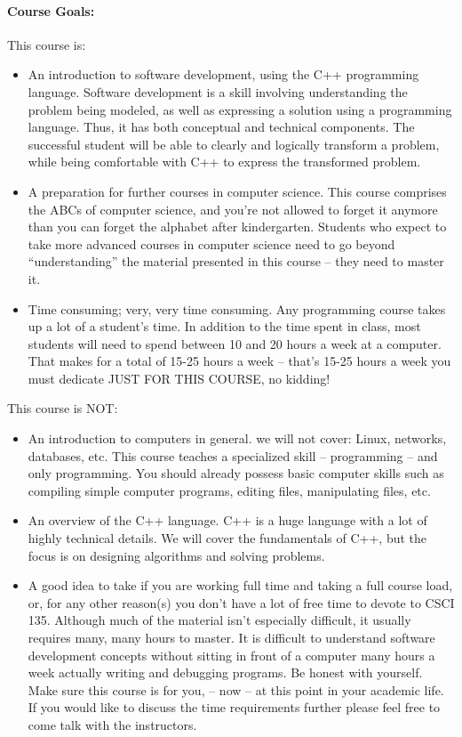 \documentclass[10pt]{article}
\begin{document}
\paragraph*{\bf Course Goals:}
This course is: 
\begin{itemize}
\item
  An introduction to software development, using the C++ programming
  language. 
  Software development is a skill involving understanding the problem
  being modeled, as well as expressing a solution using a programming
  language.
  Thus, it has both conceptual and technical components.
  The successful student will be able to clearly and logically
  transform a problem, while being comfortable with C++ to express the
  transformed problem. 
\item
  A preparation for further courses in computer science.
  This course comprises the ABCs of computer science, and you're not
  allowed to forget it anymore than you can forget the alphabet after
  kindergarten.
  Students who expect to take more advanced courses in computer
  science need to go beyond ``understanding'' the material presented
  in this course -- they need to master it. 
\item
  Time consuming; very, very time consuming.  
  Any programming course takes up a lot of a student's time. 
  In addition to the time spent in class, most students will need to
  spend between 10 and 20 hours a week at a computer. 
  That makes for a total of 15-25 hours a week -- that's 15-25 hours a
  week you must dedicate JUST FOR THIS COURSE, no kidding!
\end{itemize}
This course is NOT:
\begin{itemize}
\item 
  An introduction to computers in general. we will not cover: Linux,
  networks, databases, etc. 
  This course teaches a specialized skill -- programming -- and only
  programming. 
  You should already possess basic computer skills such as compiling
  simple computer programs, editing files, manipulating files, etc. 
\item
  An overview of the C++ language. 
  C++ is a huge language with a lot of highly technical details. 
  We will cover the fundamentals of C++, but the focus is on designing
  algorithms and solving problems.

\item
  A good idea to take if you are working full time and taking a full
  course load, or, for any other reason(s) you don't have a lot of
  free time to devote to CSCI 135.  Although much of the material
  isn't especially difficult, it usually requires many, many hours to
  master.  It is difficult to understand software development concepts
  without sitting in front of a computer many hours a week actually
  writing and debugging programs.  Be honest with yourself. Make sure
  this course is for you, -- now -- at this point in your academic
  life. If you would like to discuss the time requirements further
  please feel free to come talk with the instructors.
\end{itemize}
\end{document}
